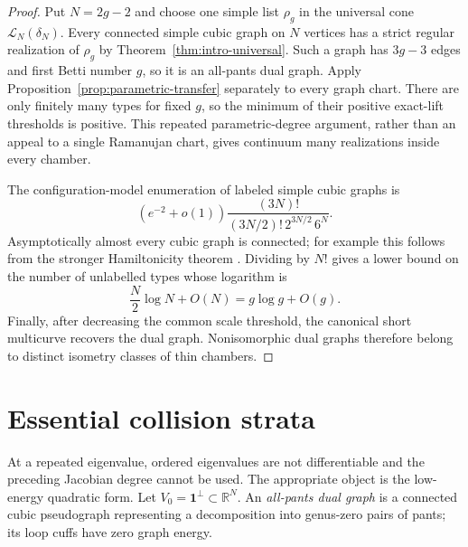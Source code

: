 \documentclass[11pt,reqno]{amsart}
\theoremstyle{definition}
\theoremstyle{remark}
\newcommand{\one}{\mathbf 1}
\newcommand{\R}{\mathbb R}
\newcommand{\cL}{\mathcal L}
\begin{document}
\begin{proof}
Put $N=2g-2$ and choose one simple list $\rho_g$ in the universal cone
$\cL_N(\delta_N)$.  Every connected simple cubic graph on $N$ vertices has
a strict regular realization of $\rho_g$ by
Theorem~\ref{thm:intro-universal}.  Such a graph has $3g-3$ edges and first
Betti number $g$, so it is an all-pants dual graph.  Apply
Proposition~\ref{prop:parametric-transfer} separately to every graph chart.
There are only finitely many types for fixed $g$, so the minimum of their
positive exact-lift thresholds is positive.  This repeated parametric-degree
argument, rather than an appeal to a single Ramanujan chart, gives continuum
many realizations inside every chamber.

The configuration-model enumeration of labeled simple cubic graphs is
\cite{Bollobas1980}
\[
 (e^{-2}+o(1))
 \frac{(3N)!}{(3N/2)!\,2^{3N/2}\,6^N}.
\]
Asymptotically almost every cubic graph is connected; for example this
follows from the stronger Hamiltonicity theorem
\cite{RobinsonWormald1992}.  Dividing by $N!$ gives a lower bound on the
number of unlabelled types whose logarithm is
\[
 \frac N2\log N+O(N)=g\log g+O(g).
\]
Finally, after decreasing the common scale threshold, the canonical short
multicurve recovers the dual graph.  Nonisomorphic dual graphs therefore
belong to distinct isometry classes of thin chambers.
\end{proof}

\section{Essential collision strata}\label{sec:essential}

At a repeated eigenvalue, ordered eigenvalues are not differentiable and the
preceding Jacobian degree cannot be used.  The appropriate object is the
low-energy quadratic form.  Let $V_0=\one^\perp\subset\R^N$.  An
\emph{all-pants dual graph} is a connected cubic pseudograph representing a
decomposition into genus-zero pairs of pants; its loop cuffs have zero graph
energy.
\end{document}
